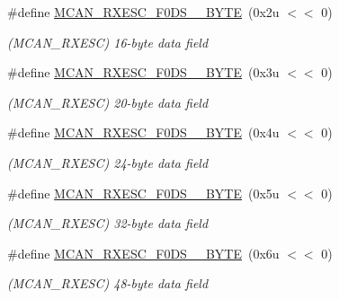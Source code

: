 \begin{DoxyCompactItemize}
\#define \mbox{\hyperlink{group__SAME70__MCAN_ga92e90e312d3f3c6e618e127e2e184b98}{M\+C\+A\+N\+\_\+\+R\+X\+E\+S\+C\+\_\+\+F0\+D\+S\+\_\+\_\+\+B\+Y\+TE}}~(0x2u $<$$<$ 0)
\begin{DoxyCompactList}\small\item\em (M\+C\+A\+N\+\_\+\+R\+X\+E\+SC) 16-\/byte data field \end{DoxyCompactList}\item 
\mbox{\label{group__SAME70__MCAN_gaea394224dce1114717d5047366a1debe}} 
\#define \mbox{\hyperlink{group__SAME70__MCAN_gaea394224dce1114717d5047366a1debe}{M\+C\+A\+N\+\_\+\+R\+X\+E\+S\+C\+\_\+\+F0\+D\+S\+\_\+\_\+\+B\+Y\+TE}}~(0x3u $<$$<$ 0)
\begin{DoxyCompactList}\small\item\em (M\+C\+A\+N\+\_\+\+R\+X\+E\+SC) 20-\/byte data field \end{DoxyCompactList}\item 
\mbox{\label{group__SAME70__MCAN_gaed2cddd308386452d98a2a4ea1c44d61}} 
\#define \mbox{\hyperlink{group__SAME70__MCAN_gaed2cddd308386452d98a2a4ea1c44d61}{M\+C\+A\+N\+\_\+\+R\+X\+E\+S\+C\+\_\+\+F0\+D\+S\+\_\+\_\+\+B\+Y\+TE}}~(0x4u $<$$<$ 0)
\begin{DoxyCompactList}\small\item\em (M\+C\+A\+N\+\_\+\+R\+X\+E\+SC) 24-\/byte data field \end{DoxyCompactList}\item 
\mbox{\label{group__SAME70__MCAN_ga2335c3bf50adc6329bb65252d8e50148}} 
\#define \mbox{\hyperlink{group__SAME70__MCAN_ga2335c3bf50adc6329bb65252d8e50148}{M\+C\+A\+N\+\_\+\+R\+X\+E\+S\+C\+\_\+\+F0\+D\+S\+\_\+\_\+\+B\+Y\+TE}}~(0x5u $<$$<$ 0)
\begin{DoxyCompactList}\small\item\em (M\+C\+A\+N\+\_\+\+R\+X\+E\+SC) 32-\/byte data field \end{DoxyCompactList}\item 
\mbox{\label{group__SAME70__MCAN_ga67b66ce86491502013e887aaebe0b01b}} 
\#define \mbox{\hyperlink{group__SAME70__MCAN_ga67b66ce86491502013e887aaebe0b01b}{M\+C\+A\+N\+\_\+\+R\+X\+E\+S\+C\+\_\+\+F0\+D\+S\+\_\+\_\+\+B\+Y\+TE}}~(0x6u $<$$<$ 0)
\begin{DoxyCompactList}\small\item\em (M\+C\+A\+N\+\_\+\+R\+X\+E\+SC) 48-\/byte data field \end{DoxyCompactList}\item 
$$
\end{DoxyCompactItemize}
